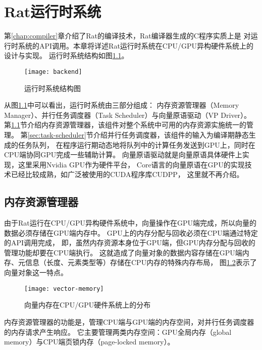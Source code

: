 \chapter{Rat运行时系统}
第\ref{chap:compiler}章介绍了Rat的编译技术，Rat编译器生成的C程序实质上是
对运行时系统的API调用。本章将详述Rat运行时系统在CPU/GPU异构硬件系统上的设计与实现。
运行时系统结构如图\ref{fig:backend}。
\begin{figure}
  \centering
  \texttt{[image: backend]}
  \caption{运行时系统结构图}
  \label{fig:backend}
\end{figure}

从图\ref{fig:backend}中可以看出，运行时系统由三部分组成：
内存资源管理器（Memory Manager）、并行任务调度器（Task Scheduler）与向量原语驱动（VP Driver）。
第\ref{sec:memory-manager}节介绍内存资源管理器，该组件对整个系统中可用的内存资源实施统一的管理。
第\ref{sec:task-scheduler}节介绍并行任务调度器，该组件的输入为编译期静态生成的任务队列，
在程序运行期动态地将队列中的计算任务发送到GPU上，同时在CPU端协同GPU完成一些辅助计算。
向量原语驱动就是向量原语具体硬件上实现，这里采用Nvidia GPU作为硬件平台，
Core语言的向量原语在GPU的实现技术已经比较成熟，如广泛被使用的CUDA程序库CUDPP，
这里就不再介绍。

\section{内存资源管理器}\label{sec:memory-manager}
由于Rat运行在CPU/GPU异构硬件系统中，向量操作在GPU端完成，所以向量的数据必须存储在GPU端内存中。
GPU上的内存分配与回收必须在CPU端通过特定的API调用完成，
即，虽然内存资源本身位于GPU端，但GPU内存分配与回收的管理功能却要在CPU端执行。
这就造成了向量对象的数据内容存储在GPU端内存、元信息（长度、元素类型等）存储在CPU内存的特殊内存布局，
图\ref{fig:vector-memory}表示了向量对象这一特点。
\begin{figure}
  \centering
  \texttt{[image: vector-memory]}
  \caption[向量内存分布]{向量内存在CPU/GPU硬件系统上的分布}
  \label{fig:vector-memory}
\end{figure}

内存资源管理器的功能是，管理CPU端与GPU端的内存空间，对并行任务调度器的内存请求产生响应。
它主要管理两类内存空间：GPU全局内存（global memory）与CPU端页锁内存（page-locked memory）。

